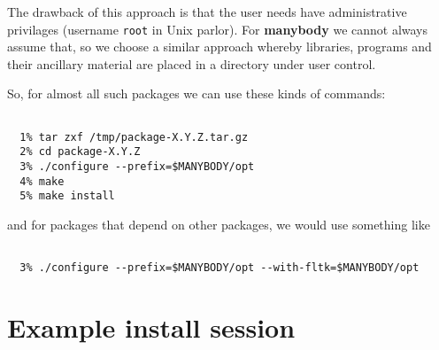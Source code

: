 \begin{itemize}
\begin{itemize}
The drawback of this approach is that the user needs have administrative
privilages (username {\tt root} in Unix parlor). For {\bf manybody} we
cannot always assume that, so we choose a similar approach whereby libraries, programs
and their ancillary material are placed in a directory under user control.


So, for almost all such packages we can use these kinds of commands:

\footnotesize\begin{verbatim}

  1% tar zxf /tmp/package-X.Y.Z.tar.gz
  2% cd package-X.Y.Z
  3% ./configure --prefix=$MANYBODY/opt
  4% make
  5% make install

\end{verbatim}\normalsize

and for packages that depend on other packages, we would use something like

\footnotesize\begin{verbatim}

  3% ./configure --prefix=$MANYBODY/opt --with-fltk=$MANYBODY/opt

\end{verbatim}\normalsize


\section{Example install session}


\end{itemize}
\end{itemize}
